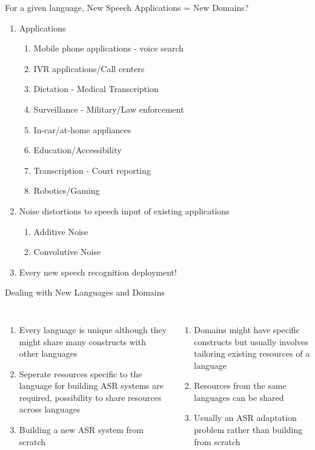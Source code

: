 \begin{frame}{For a given language, New Speech Applications = New Domains?}

\begin{enumerate}
\item Applications
\begin{enumerate}
  \item Mobile phone applications - voice search
  \item IVR applications/Call centers
  \item Dictation - Medical Transcription
  \item Surveillance - Military/Law enforcement
  \item In-car/at-home appliances
  \item Education/Accessibility
  \item Transcription - Court reporting
  \item Robotics/Gaming
\end{enumerate}
\item Noise distortions to speech input of existing applications
\begin{enumerate}
  \item Additive Noise
  \item Convolutive Noise
\end{enumerate}
\item Every new speech recognition deployment!
\end{enumerate}
\end{frame}

\begin{frame}{Dealing with New Languages and Domains}
\begin{columns}[T]
\column{2in}
\centering
{\color{orange}{New Languages}}
\begin{enumerate}
\item Every language is \alert{unique} although they might share many constructs with other languages
\item \alert{Seperate resources} specific to the language for building ASR systems are required,
possibility to share resources across languages
\item \alert{Building a new ASR system from scratch}
\end{enumerate}
\column{2in}
\centering
{\color{ForestGreen}{New Domains}}
\begin{enumerate}
\item Domains might have specific constructs but usually involves \alert{tailoring existing resources} of a language
\item Resources from the same languages can be \alert{shared}
\item Usually \alert{an ASR adaptation problem} rather than building from scratch
\end{enumerate}
\end{columns}
\end{frame}

